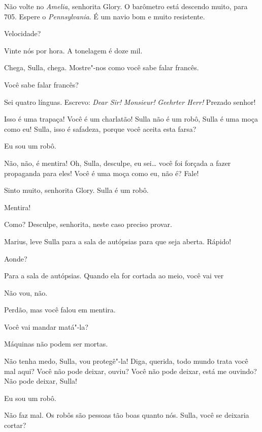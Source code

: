  Não volte no \textit{Amelia}, senhorita Glory. O barômetro está descendo muito,
para 705. Espere o \textit{Pennsylvania}. É um navio bom e muito resistente.

 Velocidade?

 Vinte nós por hora. A tonelagem é doze mil.

  Chega, Sulla, chega. Mostre"-nos como você sabe falar
francês.

 Você sabe falar francês?

 Sei quatro línguas. Escrevo: \textit{Dear Sir!} \textit{Monsieur!}
\textit{Geehrter Herr!} Prezado senhor!

  Isso é uma trapaça! Você é um charlatão!
Sulla não é um robô, Sulla é uma moça como eu! Sulla, isso é safadeza, porque
você aceita esta farsa?

 Eu sou um robô.

 Não, não, é mentira! Oh, Sulla, desculpe, eu sei\ldots{} você foi forçada a
fazer propaganda para eles! Você é uma moça como eu, não é? Fale!

 Sinto muito, senhorita Glory. Sulla é um robô.

 Mentira!

  Como?  Desculpe,
senhorita, neste caso preciso provar.

 Marius, leve Sulla para a sala de autópsias para que seja aberta.
Rápido!

 Aonde?

 Para a sala de autópsias. Quando ela for cortada ao meio, você vai ver 

 Não vou, não.

 Perdão, mas você falou em mentira.

 Você vai mandar matá"-la?

 Máquinas não podem ser mortas.

  Não tenha medo, Sulla, vou protegê"-la! Diga,
querida, todo mundo trata você mal aqui? Você não pode deixar, ouviu? Você não
pode deixar, está me ouvindo? Não pode deixar, Sulla!

 Eu sou um robô.

 Não faz mal. Os robôs são pessoas tão boas quanto nós. Sulla, você se
deixaria cortar?

